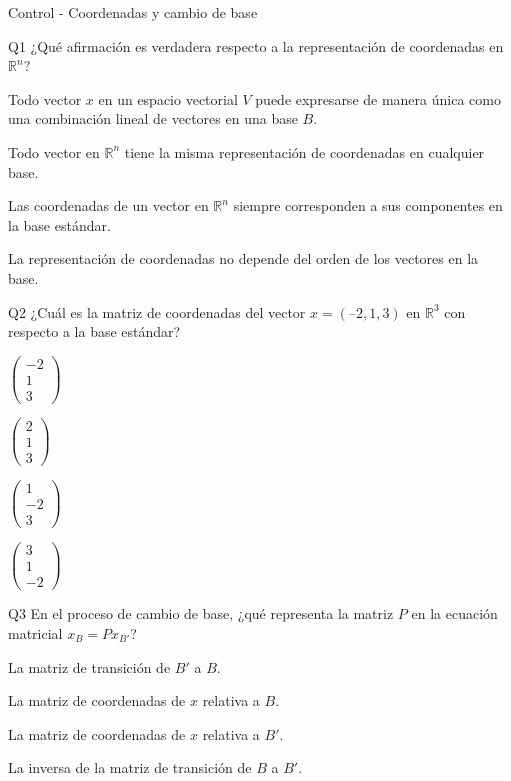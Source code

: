 \documentclass[a4,11pt]{aleph-notas}
\begin{document}
\begin{quiz}{Control - Coordenadas y cambio de base}

\begin{multi}[]{Q1}
    ¿Qué afirmación es verdadera respecto a la representación de coordenadas en $\mathbb{R}^n$?
    \item* Todo vector $x$ en un espacio vectorial $V$ puede expresarse de manera única como una combinación lineal de vectores en una base $B$.
    \item Todo vector en $\mathbb{R}^n$ tiene la misma representación de coordenadas en cualquier base.
    \item Las coordenadas de un vector en $\mathbb{R}^n$ siempre corresponden a sus componentes en la base estándar.
    \item La representación de coordenadas no depende del orden de los vectores en la base.
\end{multi}

\begin{multi}[]{Q2}
    ¿Cuál es la matriz de coordenadas del vector $x = (–2, 1, 3)$ en $\mathbb{R}^3$ con respecto a la base estándar?
    \item* $\begin{pmatrix} -2 \\ 1 \\ 3 \end{pmatrix}$
    \item $\begin{pmatrix} 2 \\ 1 \\ 3 \end{pmatrix}$
    \item $\begin{pmatrix} 1 \\ -2 \\ 3 \end{pmatrix}$
    \item $\begin{pmatrix} 3 \\ 1 \\ -2 \end{pmatrix}$
\end{multi}

\begin{multi}[]{Q3}
    En el proceso de cambio de base, ¿qué representa la matriz $P$ en la ecuación matricial $x_{B} = P x_{B'}$?
    \item* La matriz de transición de $B'$ a $B$.
    \item La matriz de coordenadas de $x$ relativa a $B$.
    \item La matriz de coordenadas de $x$ relativa a $B'$.
    \item La inversa de la matriz de transición de $B$ a $B'$.
\end{multi}


\end{quiz}
\end{document}
